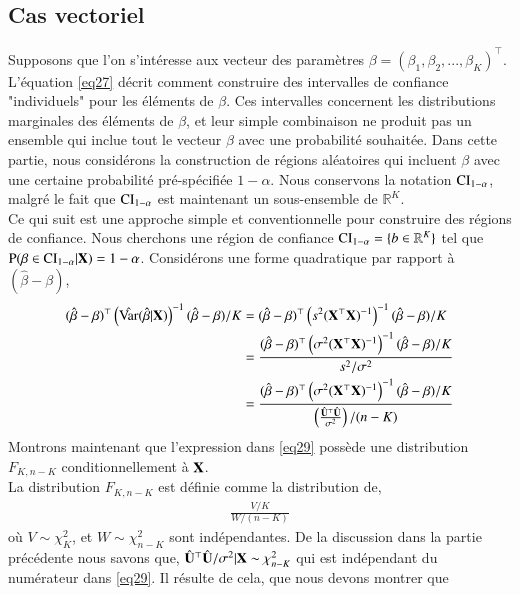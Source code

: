 \documentclass[10pt, reqno]{amsart}
\begin{document}
\subsection{Cas vectoriel}
Supposons que l'on s'intéresse aux vecteur des paramètres $\beta =(\beta_1,\beta_2,...,\beta_K)^\top$. L'équation \eqref{eq27} décrit comment construire des intervalles de confiance "individuels" pour les éléments de $\beta$. Ces intervalles concernent les distributions marginales des éléments de $\beta$, et leur simple combinaison ne produit pas un ensemble qui inclue tout le vecteur $\beta$ avec une probabilité souhaitée. Dans cette partie, nous considérons la construction de régions aléatoires qui incluent $\beta$ avec une certaine probabilité pré-spécifiée $1-\alpha$. Nous conservons la notation $\mathrm{CI}_{1-\alpha}$, malgré le fait que  $\mathrm{CI}_{1-\alpha}$ est maintenant un sous-ensemble de $\mathbb{R}^K$.\\
Ce qui suit est une approche simple et conventionnelle pour construire des régions de confiance. Nous cherchons une région de confiance $\mathrm{CI}_{1-\alpha} = \{b \in \mathbb{R}^K\}$ tel que $\operatorname{P}(\beta \in \mathrm{CI}_{1-\alpha} | \mathbf X)=1-\alpha$. Considérons une forme quadratique par rapport à $(\hat{\beta}-\beta)$,
\begin{align}
(\hat{\beta}-\beta)^\top\left(\hat{\operatorname{Var}}(\hat{\beta}|\mathbf X)\right)^{-1}(\hat{\beta}-\beta)/K &=
(\hat{\beta}-\beta)^\top\left(s^2(\mathbf X^\top\mathbf X)^{-1}
\right)^{-1}
(\hat{\beta}-\beta)/K \nonumber\\
&=\frac{
(\hat{\beta}-\beta)^\top\left(\sigma^2(\mathbf X^\top\mathbf X)^{-1}
\right)^{-1}
(\hat{\beta}-\beta)/K}
{s^2/\sigma^2}\nonumber\\
&=\frac{
(\hat{\beta}-\beta)^\top\left(\sigma^2(\mathbf X^\top\mathbf X)^{-1}
\right)^{-1}
(\hat{\beta}-\beta)/K}
{\left(\frac{\hat{\mathbf U}^\top\hat{\mathbf U}}{\sigma^2}\right)/(n-K)}
\label{eq29}
\end{align}
Montrons maintenant que l'expression dans \eqref{eq29} possède une distribution $F_{K,n-K}$ conditionnellement à $\mathbf X$.\\
La distribution $F_{K,n-K}$ est définie comme la distribution de,
\begin{align*}
\frac{V/K}{W/(n-K)}
\end{align*}
où $V \sim \chi^2_K$, et $W\sim\chi^2_{n-K}$ sont indépendantes. De la discussion dans la partie précédente nous savons que, $\hat{\mathbf U}^\top\hat{\mathbf U}/\sigma^2|\mathbf X\sim\chi^2_{n-K}$ qui est indépendant du numérateur dans \eqref{eq29}. Il résulte de cela, que nous devons montrer que 
\end{document}
